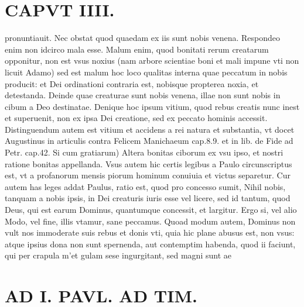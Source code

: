 \documentclass{article}
\begin{document}
\begin{pages}
\section*{CAPVT  IIII. }
\marginpar{[ p.1. ]}\pstart pronuntiauit. Nec obstat quod quaedam ex iis sunt nobis venena. Respondeo enim non idcirco mala esse. Malum enim, quod bonitati rerum creatarum opponitur, non est vsus noxius (nam arbore scientiae boni et mali impune vti non licuit Adamo) sed est malum hoc loco qualitas interna quae peccatum in nobis producit: et Dei ordinationi contraria est, nobisque propterea noxia, et detestanda. Deinde quae creaturae sunt nobis venena, illae non sunt nobis in cibum a Deo destinatae. Denique hoc ipsum vitium, quod rebus creatis nunc inest et superuenit, non ex ipsa Dei creatione, sed ex peccato hominis accessit. Distinguendum autem est vitium et accidens a rei natura et substantia, vt docet Augustinus in articulis contra Felicem Manichaeum cap.8.9. et in lib.  de Fide ad Petr. cap.42. Si cum gratiarum) Altera bonitas ciborum ex vsu ipso, et nostri ratione bonitas appellanda. Vsus autem hic certis legibus a Paulo circunscriptus est, vt a profanorum mensis piorum hominum conuiuia et victus separetur. Cur autem has leges addat Paulus, ratio est, quod pro concesso sumit, Nihil nobis, tanquam a nobis ipsis, in Dei creaturis iuris esse vel licere, sed id tantum, quod Deus, qui est earum Dominus, quantumque concessit, et largitur. Ergo si, vel alio Modo, vel fine, illis vtamur, sane peccamus. Quoad modum autem, Dominus non vult nos immoderate suis rebus et donis vti, quia hic plane abusus est, non vsus: atque ipsius dona non sunt spernenda, aut contemptim habenda, quod ii faciunt, qui per crapula m'et gulam sese ingurgitant, sed magni sunt ae\pend
\section*{AD I. PAVL. AD TIM. }
\marginpar{[ p.450 ]}\pstart {}
{}

\end{pages}
\end{document}

